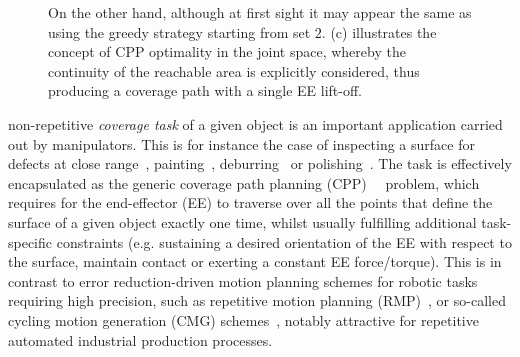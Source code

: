 \documentclass[journal]{IEEEtran}
\begin{document}
\begin{figure}[t]
{On the other hand, although at first sight it may appear the same as using the greedy strategy starting from set $2$. (c) illustrates the concept of CPP optimality in the joint space, whereby the continuity of the reachable area is explicitly considered, thus producing a coverage path with a single EE lift-off.} 
\label{fig1}
\end{figure}

% 
% 
% 
% 

 non-repetitive \textit{coverage task} of a given object is an important application carried out by manipulators.
This is for instance the case of inspecting a surface for defects at close 
range~\cite{molina2017defects}, painting~\cite{li2011painting}, deburring~\cite{xie2016grinding} or polishing~\cite{tian2016polishing}. 
The task is effectively encapsulated as the generic coverage path planning (CPP)~\cite{choset2001coverage}~\cite{galceran2013a} problem, which requires for the end-effector (EE) to traverse over all the points that define the surface of a given object exactly one time, whilst usually fulfilling additional task-specific constraints (e.g.  sustaining a desired orientation of the EE with respect to the surface, maintain contact or exerting a constant EE force/torque). 
This is in contrast to error reduction-driven  motion planning schemes for robotic tasks requiring high precision, such as repetitive motion planning (RMP)~\cite{xie2019rmp}, or so-called cycling motion generation (CMG) schemes~\cite{xie2020cyclic}, notably attractive for repetitive automated industrial production processes.
\end{document}
